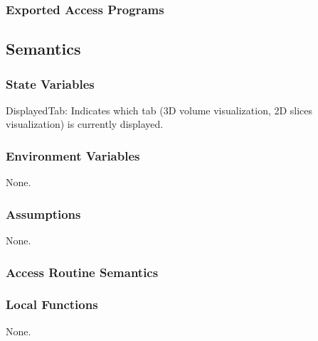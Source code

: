 \documentclass[12pt, titlepage]{article}
\begin{document}
\subsubsection{Exported Access Programs}



\subsection{Semantics}

\subsubsection{State Variables}

DisplayedTab: Indicates which tab (3D volume visualization, 2D slices visualization) is currently
displayed.



\subsubsection{Environment Variables}

None.

\subsubsection{Assumptions}

None.

\subsubsection{Access Routine Semantics}




\subsubsection{Local Functions}

None.


\newpage



\end{document}
